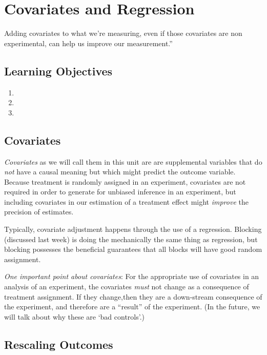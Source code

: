\documentclass[
]{article}
\providecommand{\tightlist}{%
  \setlength{\itemsep}{0pt}\setlength{\parskip}{0pt}}
\begin{document}
\hypertarget{covariates-and-regression}{%
\section{Covariates and Regression}\label{covariates-and-regression}}

Adding covariates to what we're measuring, even if those covariates are non experimental, can help us improve our
measurement.''

\hypertarget{learning-objectives-4}{%
\subsection{Learning Objectives}\label{learning-objectives-4}}

\begin{enumerate}
\def\labelenumi{\arabic{enumi}.}
\tightlist
\item
\item
\item
\end{enumerate}

\hypertarget{covariates}{%
\subsection{Covariates}\label{covariates}}

\emph{Covariates} as we will call them in this unit are are supplemental variables that do \emph{not} have a causal meaning but which might predict the outcome variable. Because treatment is randomly assigned in an experiment, covariates are not required in order to generate for unbiased inference in an experiment, but including covariates in our estimation of a treatment effect might \emph{improve} the precision of estimates.

Typically, covariate adjustment happens through the use of a regression. Blocking (discussed last week) is doing the mechanically the same thing as regression, but blocking possesses the beneficial guarantees that all blocks will have good random assignment.

\emph{One important point about covariates}: For the appropriate use of covariates in an analysis of an experiment, the covariates \emph{must} not change as a consequence of treatment assignment. If they change,then they are a down-stream consequence of the experiment, and therefore are a ``result'' of the experiment. (In the future, we will talk about why these are `bad controls'.)

\hypertarget{rescaling-outcomes}{%
\subsection{Rescaling Outcomes}\label{rescaling-outcomes}}
\end{document}
